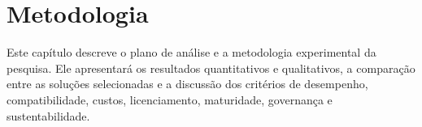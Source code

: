 \chapter{Metodologia}
\label{chp:metodologia}

Este capítulo descreve o plano de análise e a metodologia experimental da
pesquisa. Ele apresentará os resultados quantitativos e qualitativos, a
comparação entre as soluções selecionadas e a discussão dos critérios de
desempenho, compatibilidade, custos, licenciamento, maturidade, governança e
sustentabilidade.
